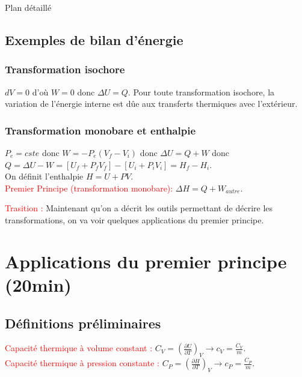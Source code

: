 \begin{reportBlock}{Plan détaillé}
 \subsection{Exemples de bilan d'énergie}
 \subsubsection{Transformation isochore}
 $dV=0$ d'où $W=0$ donc $\Delta U = Q$. Pour toute transformation isochore, la variation de l'énergie interne est dûe aux transferts thermiques avec l'extérieur.
 
 \subsubsection{Transformation monobare et enthalpie}
 $P_e=cste$ donc $W=-P_e(V_f-V_i)$ donc $\Delta U = Q + W$ donc $Q = \Delta U - W = [U_f +P_f V_f]-[U_i+P_iV_i] = H_f - H_i$.\\
 On définit l'enthalpie $H=U+PV$.\\
 
 \textcolor{red}{Premier Principe (transformation monobare):} $\Delta H = Q + W_{autre}$.

 \textcolor{red}{Trasition :} Maintenant qu'on a décrit les outils permettant de décrire les transformations, on va voir quelques applications du premier principe. 
 
  \section{Applications du premier principe (20min)}
  \subsection{Définitions préliminaires}
  \textcolor{red}{Capacité thermique à volume constant : } $C_V = (\frac{\partial{U}}{\partial{T}})_V \rightarrow c_V = \frac{C_V}{m}$. \\
  \textcolor{red}{Capacité thermique à pression constante : } $C_P = (\frac{\partial{H}}{\partial{T}})_V \rightarrow c_P = \frac{C_P}{m}$. \\
  

\end{reportBlock}
